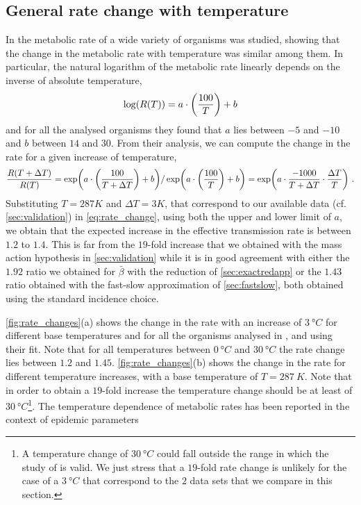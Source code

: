 \subsection{General rate change with temperature} \label{app:rate_change}

In \cite{Gillooly2248} the metabolic rate of a wide variety of organisms
was studied, showing that the change in the metabolic rate with temperature was
similar among them. In particular, the natural logarithm of the metabolic rate
linearly depends on the inverse of absolute temperature,
\begin{equation}
    \log(R(T))=a\cdot\left(\frac{100}{T}\right)+b
\end{equation}
and for all the analysed organisms they found that $a$ lies between $-5$
and $-10$ and $b$ between $14$ and $30$. From their analysis, we can compute
the change in the rate for a given increase of temperature,
\begin{equation}\label{eq:rate_change}
    \frac{R(T+\Delta T)}{R(T)}=\exp(a\cdot\left(\frac{100}{T + \Delta
            T}\right)+b) / \exp(a\cdot\left(\frac{100}{T}\right)+b) = \exp(a \cdot
    \frac{-1000}{T+\Delta T}\cdot \frac{\Delta T}{T}) \ .
\end{equation}
Substituting $T=287 K$ and $\Delta T=3 K$, that correspond to our available
data (cf. \cref{sec:validation}) in \cref{eq:rate_change}, using both the upper
and lower limit of $a$, we obtain that the expected increase in the effective
transmission rate is between $1.2$ to $1.4$. This is far from the $19$-fold
increase that we obtained with the mass action hypothesis in
\cref{sec:validation}
while it is in good agreement with either the $1.92$ ratio we obtained	for
$\bar{\beta}$ with the reduction of \cref{sec:exactredapp} or the $1.43$ ratio
obtained with the fast-slow approximation of \cref{sec:fastslow}, both obtained
using the standard incidence choice.

\cref{fig:rate_changes}(a) shows the change in the rate with an increase of
$\SI{3}{\degree C}$ for different base temperatures and for all the organisms
analysed in \cite{Gillooly2248}, and using their fit. Note that for all
temperatures between $\SI{0}{\degree C}$  and $\SI{30}{\degree C}$ the rate
change lies between $1.2$ and $1.45$. \cref{fig:rate_changes}(b) shows the
change in the rate for different temperature increases, with a base temperature
of $T=\SI{287}{K}$. Note that in order to obtain a $19$-fold increase the
temperature change should be at least of $\SI{30}{\degree C}$\footnote{A
    temperature change of $\SI{30}{\degree C}$ could fall outside the range in
    which the study of \cite{Gillooly2248} is valid. We just stress that a
    $19$-fold rate change is unlikely for the case of a $\SI{3}{\degree C}$
    that
    correspond to the $2$ data sets that we compare in this section.}.
The temperature dependence of metabolic rates has been reported in the
context of epidemic parameters \cite{COELHO2006,Shapiro2017}

